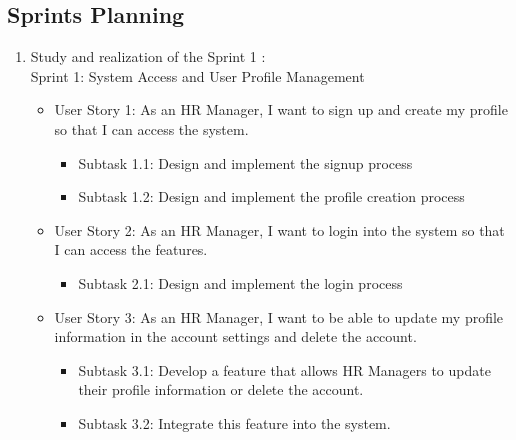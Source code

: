 \subsection{Sprints Planning}
\begin{enumerate}
    \item Study and realization of the Sprint 1 : \\
          Sprint 1: System Access and User Profile Management
          \begin{itemize}
              \renewcommand\labelitemi{-}
              \item User Story 1: As an HR Manager, I want to sign up and create my profile so that I can access the system. \\
                    \begin{itemize}
                        \item Subtask 1.1: Design and implement the signup process
                        \item Subtask 1.2: Design and implement the profile creation process
                    \end{itemize}
              \item User Story 2: As an HR Manager, I want to login into the system so that I can access the features. \\
                    \begin{itemize}
                        \item Subtask 2.1: Design and implement the login process
                    \end{itemize}
              \item User Story 3: As an HR Manager, I want to be able to update my profile information in the account settings and delete the account. \\
                    \begin{itemize}
                        \item Subtask 3.1: Develop a feature that allows HR Managers to update their profile information or delete the account.
                        \item Subtask 3.2: Integrate this feature into the system.
                    \end{itemize}
          \end{itemize}
          

\end{enumerate}
